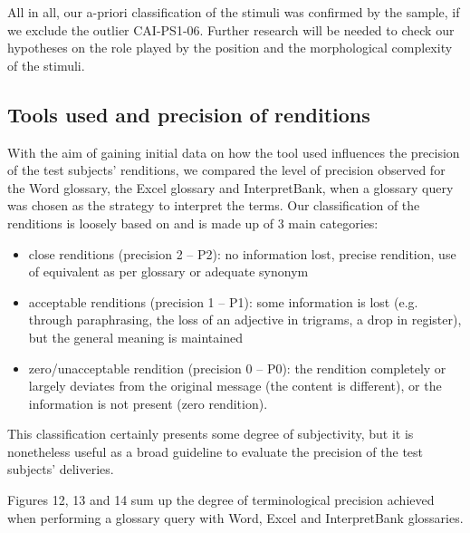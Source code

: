 \documentclass[output=paper]{langsci/langscibook}
\begin{document}
All in all, our a-priori classification of the stimuli was confirmed by the sample, if we exclude the outlier \textsc{CAI}-PS1-06. Further research will be needed to check our hypotheses on the role played by the position and the morphological complexity of the stimuli.

\subsection{Tools used and precision of renditions}\label{sec:prandi:5.2}

With the aim of gaining initial data on how the tool used influences the precision of the test subjects’ renditions, we compared the level of precision observed for the Word glossary, the Excel glossary and InterpretBank, when a glossary query was chosen as the strategy to interpret the terms. Our classification of the renditions is loosely based on \citet{Wadensjö1998} and is made up of 3 main categories:

\begin{itemize}
\item close renditions (precision 2 – P2): no information lost, precise rendition, use of equivalent as per glossary or adequate synonym
\item acceptable renditions (precision 1 – P1): some information is lost (e.g. through paraphrasing, the loss of an adjective in trigrams, a drop in register), but the general meaning is maintained
\item zero/unacceptable rendition (precision 0 – P0): the rendition completely or largely deviates from the original message (the content is different), or the information is not present (zero rendition).
\end{itemize}

This classification certainly presents some degree of subjectivity, but it is nonetheless useful as a broad guideline to evaluate the precision of the test subjects’ deliveries.

Figures 12, 13 and 14 sum up the degree of terminological precision achieved when performing a glossary query with Word, Excel and InterpretBank glossaries. 
\end{document}
